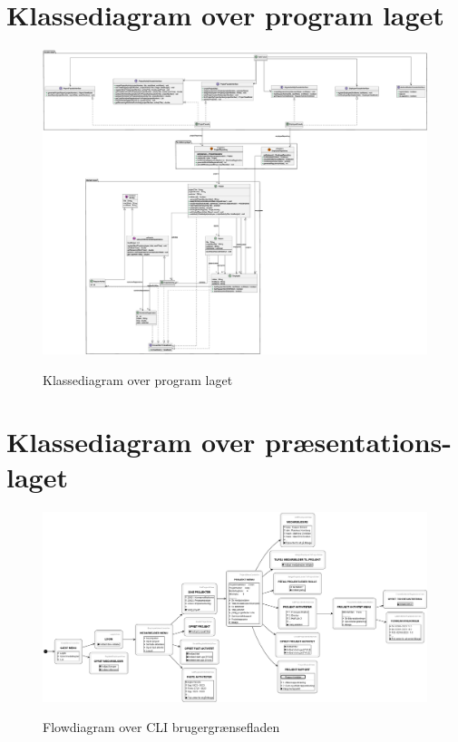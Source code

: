 \begin{landscape}
    \section{Klassediagram over program laget}\label{apdx:classDiagram_full}
    \begin{figure}[H]
        \centering
        \caption{Klassediagram over program laget}
        \includegraphics[width = \textheight]{ImplementationAndTest/Diagrams/ClassDiagrams/ClassDiagram_full.eps}
        \label{fig:classDiagram_full}
    \end{figure}
    \section{Klassediagram over præsentations-laget}\label{apdx:classDiagram_presentation}
    \begin{figure}[H]
        \centering
        \caption{Flowdiagram over CLI brugergrænsefladen}
        \includegraphics[width = \linewidth]{ImplementationAndTest/Diagrams/FlowCharts/flow_cli.eps}
        \label{fig:flow_cli_big}
    \end{figure}

\end{landscape}
